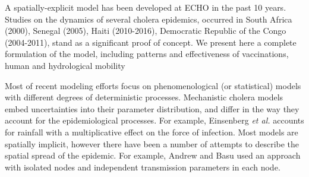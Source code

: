 A spatially-explicit model has been developed at ECHO in the past 10 years\parencite{Bertuzzo:SpacetimeEvolutionCholera:2008}. Studies on the dynamics of several cholera epidemics, occurred in South Africa (2000)\parencite{Mari:ModellingCholeraEpidemics:2012}, Senegal (2005), Haiti (2010-2016)\parencite{Bertuzzo:PredictionSpatialEvolution:2011}, Democratic Republic of the Congo  (2004-2011), stand as a significant proof of concept.  
We present here a complete formulation of the model, including patterns and effectiveness of vaccinations, human and hydrological mobility\cite{Bertuzzo:ProbabilityExtinctionHaiti:2016,Pasetto:RealtimeProjectionsCholera:2017}


Most of recent modeling efforts focus on phenomenological (or statistical) models with different degrees of deterministic processes\cite{Azman:UrbanCholeraTransmission:2012,Finger:PotentialImpactCasearea:2018,Camacho:CholeraEpidemicYemen:2018,Lessler:MappingBurdenCholera:2018,Koelle:DisentanglingExtrinsicIntrinsic:2004}. Mechanistic cholera models embed uncertainties into their parameter distribution, and differ in the way they account for the epidemiological processes\cite{Kirpich:ControllingCholeraOuest:2017,Tuite:CholeraEpidemicHaiti:2011,Chao:VaccinationStrategiesEpidemic:2011,Kirpich:CholeraTransmissionOuest:2015}. For example, Einsenberg \textit{et al.} accounts for rainfall with a multiplicative effect on the force of infection\cite{Eisenberg:ExaminingRainfallCholera:2013,Eisenberg:IdentifiabilityEstimationMultiple:2013,Eisenberg:CholeraModelPatchy:2013}. Most models are spatially implicit, however there have been a number of attempts to describe the spatial spread of the epidemic. For example, Andrew and Basu used an approach with isolated nodes and independent transmission parameters in each node\cite{Andrews:TransmissionDynamicsControl:2011}.


